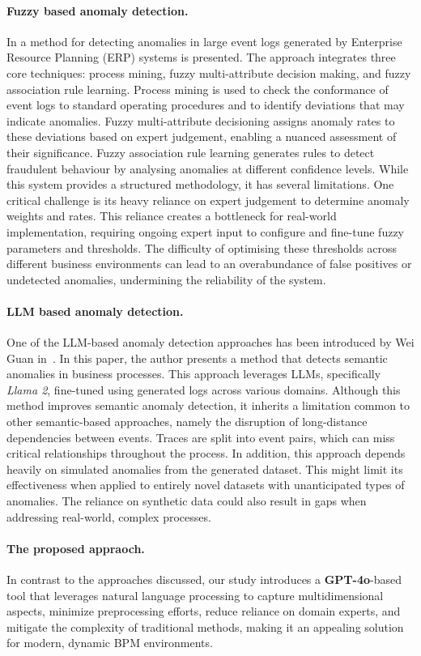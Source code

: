\paragraph{Fuzzy based anomaly detection.}
In \cite{b3} a method for detecting anomalies in large event logs generated by Enterprise Resource Planning (ERP) systems is presented. The approach integrates three core techniques: process mining, fuzzy multi-attribute decision making, and fuzzy association rule learning.
%
Process mining is used to check the conformance of event logs to standard operating procedures and to identify deviations that may indicate anomalies.
Fuzzy multi-attribute decisioning assigns anomaly rates to these deviations based on expert judgement, enabling a nuanced assessment of their significance.
Fuzzy association rule learning generates rules to detect fraudulent behaviour by analysing anomalies at different confidence levels.
%
While this system provides a structured methodology, it has several limitations. One critical challenge is its heavy reliance on expert judgement to determine anomaly weights and rates. This reliance creates a bottleneck for real-world implementation, requiring ongoing expert input to configure and fine-tune fuzzy parameters and thresholds. The difficulty of optimising these thresholds across different business environments can lead to an overabundance of false positives or undetected anomalies, undermining the reliability of the system.

\paragraph{LLM based anomaly detection.}
One of the LLM-based anomaly detection approaches has been introduced by Wei Guan in~\cite{b5}. In this paper, the author presents a method that detects semantic anomalies in business processes. This approach leverages LLMs, specifically \textit{Llama 2}, fine-tuned using generated logs across various domains. 
%
Although this method improves semantic anomaly detection, it inherits a limitation common to other semantic-based approaches, namely the disruption of long-distance dependencies between events. Traces are split into event pairs, which can miss critical relationships throughout the process.
%
In addition, this approach depends heavily on simulated anomalies from the generated dataset. This might limit its effectiveness when applied to entirely novel datasets with unanticipated types of anomalies. The reliance on synthetic data could also result in gaps when addressing real-world, complex processes.

\paragraph{The proposed appraoch.}
In contrast to the approaches discussed, our study introduces a \textbf{GPT-4o}-based tool that leverages natural language processing to capture multidimensional aspects, minimize preprocessing efforts, reduce reliance on domain experts, and mitigate the complexity of traditional methods, making it an appealing solution for modern, dynamic BPM environments.